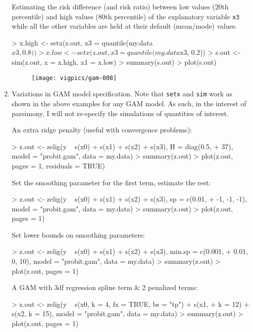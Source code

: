 \begin{enumerate}
Estimating the risk difference (and risk ratio) between low values (20th percentile) and high values (80th percentile) of the explanatory variable {\tt x3} while all the other variables are held at their default (mean/mode) values. 

\begin{Schunk}
\begin{Sinput}
> x.high <- setx(z.out, x3 = quantile(my.data$x3, 0.8))
> x.low <- setx(z.out, x3 = quantile(my.data$x3, 0.2))
> s.out <- sim(z.out, x = x.high, x1 = x.low)
> summary(s.out)
> plot(s.out)
\end{Sinput}
\end{Schunk}
\begin{figure}[here]
\centering
\texttt{[image: vigpics/gam-008]}
\label{fig:plotgam}
\end{figure}

\item Variations in GAM model specification. Note that {\tt setx} and {\tt sim} work as shown in the above examples for any GAM model. As such, in the interest of parsimony, I will not re-specify the simulations of quantities of interest. 

An extra ridge penalty (useful with convergence problems):
\begin{Schunk}
\begin{Sinput}
> z.out <- zelig(y ~ s(x0) + s(x1) + s(x2) + s(x3), H = diag(0.5, 
+     37), model = "probit.gam", data = my.data)
> summary(z.out)
> plot(z.out, pages = 1, residuals = TRUE)
\end{Sinput}
\end{Schunk}
Set the smoothing parameter for the first term, estimate the rest:
\begin{Schunk}
\begin{Sinput}
> z.out <- zelig(y ~ s(x0) + s(x1) + s(x2) + s(x3), sp = c(0.01, 
+     -1, -1, -1), model = "probit.gam", data = my.data)
> summary(z.out)
> plot(z.out, pages = 1)
\end{Sinput}
\end{Schunk}
Set lower bounds on smoothing parameters:
\begin{Schunk}
\begin{Sinput}
> z.out <- zelig(y ~ s(x0) + s(x1) + s(x2) + s(x3), min.sp = c(0.001, 
+     0.01, 0, 10), model = "probit.gam", data = my.data)
> summary(z.out)
> plot(z.out, pages = 1)
\end{Sinput}
\end{Schunk}
A GAM with 3df regression spline term \& 2 penalized terms:
\begin{Schunk}
\begin{Sinput}
> z.out <- zelig(y ~ s(x0, k = 4, fx = TRUE, bs = "tp") + s(x1, 
+     k = 12) + s(x2, k = 15), model = "probit.gam", data = my.data)
> summary(z.out)
> plot(z.out, pages = 1)
\end{Sinput}
\end{Schunk}
\end{enumerate}



